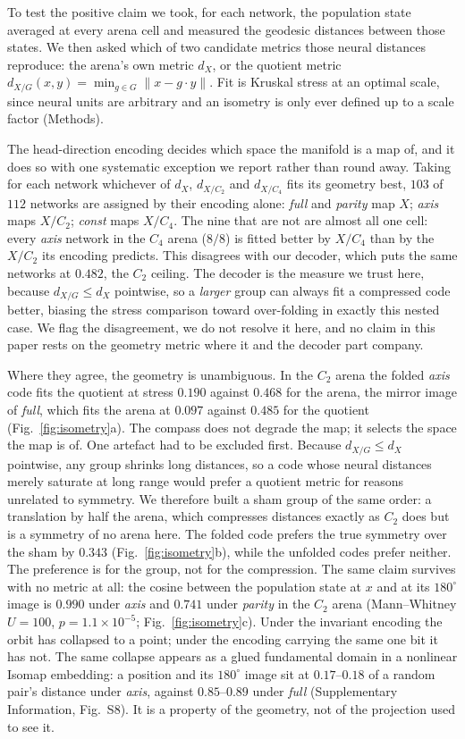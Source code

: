 \documentclass[9pt,lineno]{elife}
\begin{document}
To test the positive claim we took, for each network, the population state averaged at every arena cell
and measured the geodesic distances between those states. We then asked which of two candidate metrics
those neural distances reproduce: the arena's own metric $d_X$, or the quotient metric
$d_{X/G}(x,y) = \min_{g \in G} \lVert x - g\!\cdot\!y \rVert$. Fit is Kruskal stress at an optimal scale,
since neural units are arbitrary and an isometry is only ever defined up to a scale factor (Methods).

The head-direction encoding decides which space the manifold is a map of, and it does so with one
systematic exception we report rather than round away. Taking for each network whichever of $d_X$,
$d_{X/C_2}$ and $d_{X/C_4}$ fits its geometry best, $103$ of $112$ networks are assigned by their
encoding alone: \textit{full} and \textit{parity} map $X$; \textit{axis} maps $X/C_2$; \textit{const}
maps $X/C_4$. The nine that are not are almost all one cell: every \textit{axis} network in the $C_4$
arena ($8/8$) is fitted better by $X/C_4$ than by the $X/C_2$ its encoding predicts. This disagrees
with our decoder, which puts the same networks at $0.482$, the $C_2$ ceiling. The decoder is the
measure we trust here, because $d_{X/G} \le d_X$ pointwise, so a \emph{larger} group can always fit a
compressed code better, biasing the stress comparison toward over-folding in exactly this nested case.
We flag the disagreement, we do not resolve it here, and no claim in this paper rests on the geometry
metric where it and the decoder part company.

Where they agree, the geometry is unambiguous. In the $C_2$ arena the folded \textit{axis} code fits
the quotient at stress $0.190$ against $0.468$ for the arena, the mirror image of \textit{full}, which
fits the arena at $0.097$ against $0.485$ for the quotient (Fig.~\ref{fig:isometry}a). The compass does
not degrade the map; it selects the space the map is of. One artefact had to be excluded first. Because
$d_{X/G} \le d_X$ pointwise, any group shrinks long distances, so a code whose neural distances merely
saturate at long range would prefer a quotient metric for reasons unrelated to symmetry. We therefore
built a sham group of the same order: a translation by half the arena, which compresses distances
exactly as $C_2$ does but is a symmetry of no arena here. The folded code prefers the true symmetry
over the sham by $0.343$ (Fig.~\ref{fig:isometry}b), while the unfolded codes prefer neither. The
preference is for the group, not for the compression. The same claim survives with no metric at all:
the cosine between the population state at $x$ and at its $180^\circ$ image is $0.990$ under
\textit{axis} and $0.741$ under \textit{parity} in the $C_2$ arena (Mann--Whitney $U = 100$,
$p = 1.1\times10^{-5}$; Fig.~\ref{fig:isometry}c). Under the invariant encoding the orbit has collapsed
to a point; under the encoding carrying the same one bit it has not. The same collapse appears as a
glued fundamental domain in a nonlinear Isomap embedding: a position and its $180^\circ$ image sit
at $0.17$--$0.18$ of a random pair's distance under \textit{axis}, against $0.85$--$0.89$ under
\textit{full} (Supplementary Information, Fig.~S8). It is a property of the geometry, not of the
projection used to see it.
\end{document}
